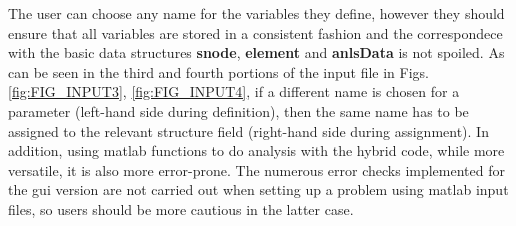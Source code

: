 \begin{appendices}
The user can choose any name for the variables they define, however they should 
ensure that all variables are stored in a consistent fashion and the 
correspondece with the basic data structures \textbf{snode}, \textbf{element} 
and \textbf{anlsData} is not spoiled. As can be seen in the third and fourth 
portions of the input file in Figs. \ref{fig:FIG_INPUT3}, \ref{fig:FIG_INPUT4}, 
if a different name is chosen for a parameter (left-hand side during 
definition), then the same name has to be assigned to the relevant structure 
field (right-hand side during assignment). In addition, using matlab functions 
to do analysis with the hybrid code, while more versatile, it is also more 
error-prone. The numerous error checks implemented for the \acrshort{gui} 
version are not carried out when setting up a problem using matlab input files, 
so users should be more cautious in the latter case.


\end{appendices}